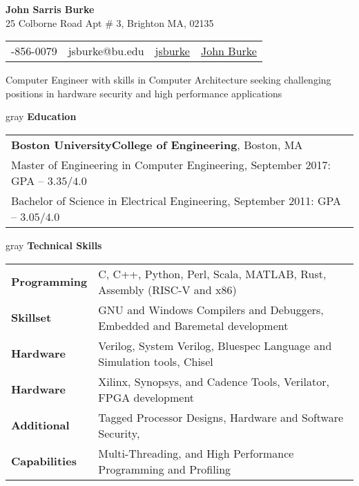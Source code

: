 \documentclass[10.5pt,letterpaper]{article}
\makeatletter
\newcommand{\org}[1]{\textbf{#1}}
\newcommand{\vertspace}{\vspace{1.2mm}}
\newcommand{\horzindent}{\hspace{3mm}}
\newcommand{\tablewidth}{.9\linewidth}
\newcommand{\name}{John Sarris Burke}
\newcommand{\infoshift}{\hspace{15.5mm}}
\newcommand{\address}{25 Colborne Road Apt \# 3, Brighton MA, 02135 }
\newcommand{\phone}{781-856-0079}
\newcommand{\email}{jsburke@bu.edu}
\newcommand{\github}{\href{https://github.com/jsburke/}{jsburke}}
\newcommand{\linkedin}{\href{https://www.linkedin.com/in/john-burke-51325935/}{John Burke}}
\newcommand{\undergradmajor}{Electrical Engineering}
\newcommand{\undergradend}{September 2011}
\newcommand{\grad}{Boston University}
\newcommand{\gradschool}{College of Engineering}
\newcommand{\gradmajor}{Computer Engineering}
\newcommand{\gradend}{September 2017}
\newcommand{\objective}{Computer Engineer with skills in Computer Architecture seeking challenging positions in hardware security and high performance applications}
\newlength\myheight
\newlength\mydepth
\newcommand*\inlineicon[1]{%
  \settototalheight\myheight{Xygp}%
  \settodepth\mydepth{Xygp}%
  \raisebox{-\mydepth}{\texttt{[image: \#1]}}%
}
\newcommand{\iconemail}{\inlineicon{images/email-icon-2048}\space}
\newcommand{\icongithub}{\inlineicon{images/GitHub-Mark-120px-plus}\space}
\newcommand{\iconphone}{\inlineicon{images/phone-icon-black}\space}
\newcommand{\iconlinkedin}{\inlineicon{images/linkedin-icon-black}\space}
\makeatother
\begin{document}
	
	\begin{center}	
		\textbf{\large \name}\\
		\address\\
		\begin{tabular}{c||c||c||c}
			\infoshift \iconphone \phone & \iconemail \email & \icongithub \github & \iconlinkedin \linkedin \\
		\end{tabular}
		\newline \objective
	\end{center}

	\noindent
	\begin{heading}{gray}
		\textbf{Education}
	\end{heading}
		\begin{tabular*}{\tablewidth}{l}
			\org{\grad\space\gradschool}, Boston, MA \\
			\horzindent Master of Engineering in \gradmajor , \gradend\space : GPA -- $3.35 / 4.0$ \\
			\horzindent Bachelor of Science in \undergradmajor , \undergradend : GPA -- $3.05 / 4.0$ \\
		\end{tabular*}

	\noindent
	\begin{heading}{gray}
		\textbf{Technical Skills}
	\end{heading}
	\begin{tabular*}{\tablewidth}{ll}
          \textbf{Programming}  & C, C++, Python, Perl, Scala, MATLAB, Rust, Assembly (RISC-V and x86) \\
          \textbf{Skillset}     & GNU and Windows Compilers and Debuggers, Embedded and Baremetal development \\ \hline
          \textbf{Hardware}     & Verilog, System Verilog, Bluespec Language and Simulation tools, Chisel \\
          \textbf{Hardware}     & Xilinx, Synopsys, and Cadence Tools, Verilator, FPGA development \\ \hline
          \textbf{Additional}   & Tagged Processor Designs, Hardware and Software Security,\\
          \textbf{Capabilities} & Multi-Threading, and High Performance Programming and Profiling \\ 
	\end{tabular*}

	\iffalse
	
\end{document}
